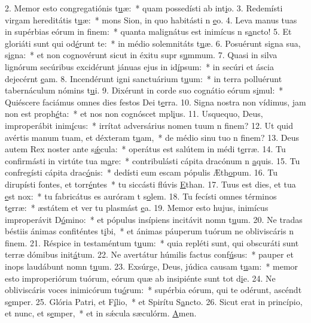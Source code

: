 2. Memor esto congregatiónis t\uline{u}æ:~* quam possedísti ab int\uline{i}o.
3. Redemísti virgam hereditátis t\uline{u}æ:~* mons Sion, in quo habitásti n \uline{e}o.
4. Leva manus tuas in supérbias eórum in f\uline{i}nem:~* quanta malignátus est inimícus n s\uline{a}ncto!
5. Et gloriáti sunt qui od\uline{é}runt te:~* in médio solemnitáts t\uline{u}æ.
6. Posuérunt signa sua, s\uline{i}gna:~* et non cognovérunt sicut in éxitu supr s\uline{u}mmum.
7. Quasi in silva lignórum secúribus excidérunt jánuas ejus in id\uline{í}psum:~* in secúri et áscia dejecérnt \uline{e}am.
8. Incendérunt igni sanctuárium t\uline{u}um:~* in terra polluérunt tabernáculum nómins t\uline{u}i.
9. Dixérunt in corde suo cognátio eórum s\uline{i}mul:~* Quiéscere faciámus omnes dies festos Dei  t\uline{e}rra.
10. Signa nostra non vídimus, jam non est proph\uline{é}ta:~* et nos non cognóscet mpl\uline{i}us.
11. Usquequo, Deus, improperábit inim\uline{í}cus:~* irrítat adversárius nomen tuum n f\uline{i}nem?
12. Ut quid avértis manum tuam, et déxteram t\uline{u}am,~* de médio sinu tuo n f\uline{i}nem?
13. Deus autem Rex noster ante s\uline{ǽ}cula:~* operátus est salútem in médi t\uline{e}rræ.
14. Tu confirmásti in virtúte tua m\uline{a}re:~* contribulásti cápita dracónum n \uline{a}quis.
15. Tu confregísti cápita drac\uline{ó}nis:~* dedísti eum escam pópulis Æth\uline{o}pum.
16. Tu dirupísti fontes, et torr\uline{é}ntes~* tu siccásti flúvis \uline{E}than.
17. Tuus est dies, et tua \uline{e}st nox:~* tu fabricátus es auróram t s\uline{o}lem.
18. Tu fecísti omnes términos t\uline{e}rræ:~* æstátem et ver tu plasmást \uline{e}a.
19. Memor esto hujus, inimícus improperávit D\uline{ó}mino:~* et pópulus insípiens incitávit nomn t\uline{u}um.
20. Ne tradas béstiis ánimas confiténtes t\uline{i}bi,~* et ánimas páuperum tuórum ne obliviscáris n f\uline{i}nem.
21. Réspice in testaméntum t\uline{u}um:~* quia repléti sunt, qui obscuráti sunt terræ dómibus init\uline{á}tum.
22. Ne avertátur húmilis factus conf\uline{ú}sus:~* pauper et inops laudábunt nomn t\uline{u}um.
23. Exsúrge, Deus, júdica causam t\uline{u}am:~* memor esto improperiórum tuórum, eórum quæ ab insipiénte sunt tot d\uline{i}e.
24. Ne obliviscáris voces inimicórum tu\uline{ó}rum:~* supérbia eórum, qui te odérunt, ascéndt s\uline{e}mper.
25. Glória Patri, et F\uline{í}lio,~* et Spirítu S\uline{a}ncto.
26. Sicut erat in princípio, et nunc, et s\uline{e}mper,~* et in sǽcula sæculórm. \uline{A}men.
